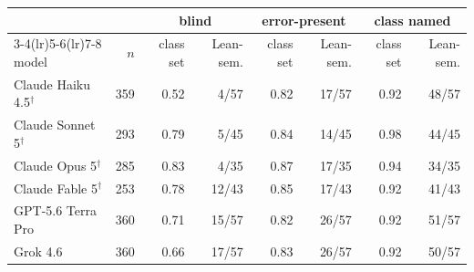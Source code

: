 \begin{tabular}{lrrrrrrr}
\toprule
 & & \multicolumn{2}{c}{blind} & \multicolumn{2}{c}{error-present} & \multicolumn{2}{c}{class named} \\
\cmidrule(lr){3-4}\cmidrule(lr){5-6}\cmidrule(lr){7-8}
model & $n$ & class set & Lean-sem. & class set & Lean-sem. & class set & Lean-sem. \\
\midrule
    Claude Haiku 4.5$^{\dagger}$ & 359 & 0.52 & 4/57 & 0.82 & 17/57 & 0.92 & 48/57 \\
    Claude Sonnet 5$^{\dagger}$ & 293 & 0.79 & 5/45 & 0.84 & 14/45 & 0.98 & 44/45 \\
    Claude Opus 5$^{\dagger}$ & 285 & 0.83 & 4/35 & 0.87 & 17/35 & 0.94 & 34/35 \\
    Claude Fable 5$^{\dagger}$ & 253 & 0.78 & 12/43 & 0.85 & 17/43 & 0.92 & 41/43 \\
    GPT-5.6 Terra Pro & 360 & 0.71 & 15/57 & 0.82 & 26/57 & 0.92 & 51/57 \\
    Grok 4.6 & 360 & 0.66 & 17/57 & 0.83 & 26/57 & 0.92 & 50/57 \\
\bottomrule
\end{tabular}
